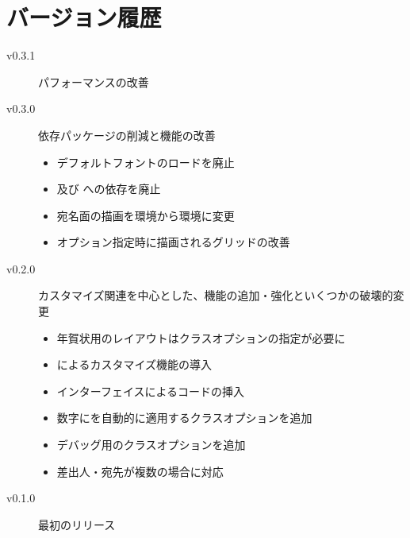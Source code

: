 \documentclass{hagaki-doc}
\begin{document}
\section{バージョン履歴}

\begin{description}
  \item[v0.3.1] パフォーマンスの改善
  \item[v0.3.0] 依存パッケージの削減と機能の改善
    \leavevmode
    \begin{itemize}
      \item デフォルトフォントのロードを廃止
      \item {}及び への依存を廃止
      \item 宛名面の描画を環境から環境に変更
      \item {}オプション指定時に描画されるグリッドの改善
    \end{itemize}
  \item[v0.2.0] カスタマイズ関連を中心とした、機能の追加・強化といくつかの破壊的変更
    \leavevmode
    \begin{itemize}
      \item 年賀状用のレイアウトはクラスオプションの指定が必要に
      \item {}によるカスタマイズ機能の導入
      \item {}インターフェイスによるコードの挿入
      \item 数字にを自動的に適用するクラスオプションを追加
      \item デバッグ用のクラスオプションを追加
      \item 差出人・宛先が複数の場合に対応
    \end{itemize}
  \item[v0.1.0] 最初のリリース
\end{description}
\end{document}
